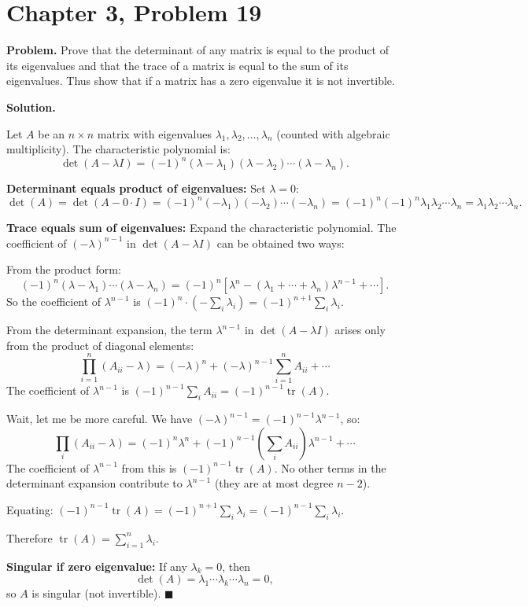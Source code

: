\documentclass[12pt]{article}
\begin{document}
\section*{Chapter 3, Problem 19}

\textbf{Problem.} Prove that the determinant of any matrix is equal to the product of its eigenvalues and that the trace of a matrix is equal to the sum of its eigenvalues. Thus show that if a matrix has a zero eigenvalue it is not invertible.

\bigskip
\textbf{Solution.}

Let $A$ be an $n\times n$ matrix with eigenvalues $\lambda_1, \lambda_2, \ldots, \lambda_n$ (counted with algebraic multiplicity). The characteristic polynomial is:
\[
\det(A - \lambda I) = (-1)^n(\lambda - \lambda_1)(\lambda - \lambda_2)\cdots(\lambda - \lambda_n).
\]

\textbf{Determinant equals product of eigenvalues:} Set $\lambda = 0$:
\[
\det(A) = \det(A - 0 \cdot I) = (-1)^n(-\lambda_1)(-\lambda_2)\cdots(-\lambda_n) = (-1)^n(-1)^n\lambda_1\lambda_2\cdots\lambda_n = \lambda_1\lambda_2\cdots\lambda_n.
\]

\textbf{Trace equals sum of eigenvalues:} Expand the characteristic polynomial. The coefficient of $(-\lambda)^{n-1}$ in $\det(A - \lambda I)$ can be obtained two ways:

From the product form:
\[
(-1)^n(\lambda - \lambda_1)\cdots(\lambda - \lambda_n) = (-1)^n\left[\lambda^n - (\lambda_1 + \cdots + \lambda_n)\lambda^{n-1} + \cdots\right].
\]
So the coefficient of $\lambda^{n-1}$ is $(-1)^n \cdot (-\sum_i \lambda_i) = (-1)^{n+1}\sum_i \lambda_i$.

From the determinant expansion, the term $\lambda^{n-1}$ in $\det(A - \lambda I)$ arises only from the product of diagonal elements:
\[
\prod_{i=1}^{n}(A_{ii} - \lambda) = (-\lambda)^n + (-\lambda)^{n-1}\sum_{i=1}^{n} A_{ii} + \cdots
\]
The coefficient of $\lambda^{n-1}$ is $(-1)^{n-1}\sum_i A_{ii} = (-1)^{n-1}\operatorname{tr}(A)$.

Wait, let me be more careful. We have $(-\lambda)^{n-1} = (-1)^{n-1}\lambda^{n-1}$, so:
\[
\prod_i (A_{ii}-\lambda) = (-1)^n\lambda^n + (-1)^{n-1}\left(\sum_i A_{ii}\right)\lambda^{n-1} + \cdots
\]
The coefficient of $\lambda^{n-1}$ from this is $(-1)^{n-1}\operatorname{tr}(A)$. No other terms in the determinant expansion contribute to $\lambda^{n-1}$ (they are at most degree $n-2$).

Equating: $(-1)^{n-1}\operatorname{tr}(A) = (-1)^{n+1}\sum_i \lambda_i = (-1)^{n-1}\sum_i \lambda_i$.

Therefore $\operatorname{tr}(A) = \sum_{i=1}^{n}\lambda_i$.

\medskip
\textbf{Singular if zero eigenvalue:} If any $\lambda_k = 0$, then
\[
\det(A) = \lambda_1 \cdots \lambda_k \cdots \lambda_n = 0,
\]
so $A$ is singular (not invertible). \hfill $\blacksquare$
\end{document}
